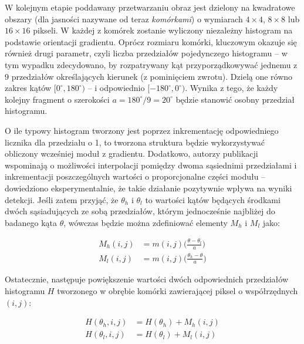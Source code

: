 W kolejnym etapie poddawany przetwarzaniu obraz jest dzielony na kwadratowe obszary (dla jasności nazywane od teraz \textit{komórkami}) o wymiarach $4\times4$, $8\times8$ lub $16\times16$ pikseli. 
W każdej z komórek zostanie wyliczony niezależny histogram na podstawie orientacji gradientu.
Oprócz rozmiaru komórki, kluczowym okazuje się również drugi parametr, czyli liczba przedziałów pojedynczego histogramu -- w tym wypadku zdecydowano, by rozpatrywany kąt przyporządkowywać jednemu z 9 przedziałów określających kierunek (z pominięciem zwrotu). Dzielą one równo zakres kątów $[0^{\circ},180^{\circ})$ -- i odpowiednio $[-180^{\circ},0^{\circ})$. 
Wynika z tego, że każdy kolejny fragment o szerokości $a=180^{\circ}/9=20^{\circ}$ będzie stanowić osobny przedział histogramu.

O ile typowy histogram tworzony jest poprzez inkrementację odpowiedniego licznika dla przedziału o 1, to tworzona struktura będzie wykorzystywać obliczony wcześniej moduł z gradientu. 
Dodatkowo, autorzy publikacji wspominają o możliwości interpolacji pomiędzy dwoma sąsiednimi przedziałami i inkrementacji poszczególnych wartości o proporcjonalne części modułu -- dowiedziono eksperymentalnie, że takie działanie pozytywnie wpływa na wyniki detekcji. 
Jeśli zatem przyjąć, że $\theta_h$ i $\theta_l$ to wartości kątów będących środkami dwóch sąsiadujących ze sobą przedziałów, którym jednocześnie najbliżej do badanego kąta $\theta$, wówczas będzie można zdefiniować elementy $M_h$ i $M_l$ jako: 

\begin{equation}
\label{eq:HOG_linear}
\left.\begin{aligned}
M_h(i,j)&=m(i,j)\bigg(\frac{\theta-\theta_l}{a}\bigg)\\
M_l(i,j)&=m(i,j)\bigg(\frac{\theta_h-\theta}{a}\bigg)
\end{aligned}\right.
\end{equation}

Ostatecznie, następuje powiększenie wartości dwóch odpowiednich przedziałów histogramu $H$ tworzonego w obrębie komórki zawierającej piksel o współrzędnych $(i,j)$:

\begin{equation}
\label{eq:HOG_increment}
\left.\begin{aligned} 
H(\theta_h,i,j)&=H(\theta_h)+M_h(i,j) \\ 
H(\theta_l,i,j)&=H(\theta_l)+M_l(i,j)
\end{aligned}\right.
\end{equation}


